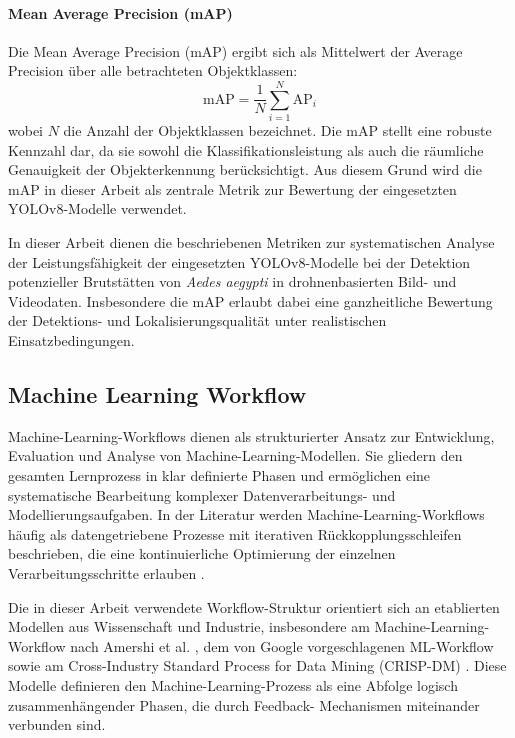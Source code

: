 \paragraph{Mean Average Precision (mAP)}
Die Mean Average Precision (mAP) ergibt sich als Mittelwert der Average Precision
über alle betrachteten Objektklassen:
\begin{equation}
\text{mAP} = \frac{1}{N} \sum_{i=1}^{N} \text{AP}_i
\end{equation}
wobei $N$ die Anzahl der Objektklassen bezeichnet. Die mAP stellt eine robuste
Kennzahl dar, da sie sowohl die Klassifikationsleistung als auch die räumliche
Genauigkeit der Objekterkennung berücksichtigt. Aus diesem Grund wird die mAP in
dieser Arbeit als zentrale Metrik zur Bewertung der eingesetzten YOLOv8-Modelle
verwendet.

In dieser Arbeit dienen die beschriebenen Metriken zur systematischen Analyse der
Leistungsfähigkeit der eingesetzten YOLOv8-Modelle bei der Detektion potenzieller
Brutstätten von \textit{Aedes aegypti} in drohnenbasierten Bild- und Videodaten.
Insbesondere die mAP erlaubt dabei eine ganzheitliche Bewertung der Detektions-
und Lokalisierungsqualität unter realistischen Einsatzbedingungen.


\subsection{Machine Learning Workflow}


Machine-Learning-Workflows dienen als strukturierter Ansatz zur
Entwicklung, Evaluation und Analyse von Machine-Learning-Modellen.
Sie gliedern den gesamten Lernprozess in klar definierte Phasen und
ermöglichen eine systematische Bearbeitung komplexer
Datenverarbeitungs- und Modellierungsaufgaben. In der Literatur werden
Machine-Learning-Workflows häufig als datengetriebene Prozesse mit
iterativen Rückkopplungsschleifen beschrieben, die eine kontinuierliche
Optimierung der einzelnen Verarbeitungsschritte erlauben
\cite{Amershi2019}.

Die in dieser Arbeit verwendete Workflow-Struktur orientiert sich an
etablierten Modellen aus Wissenschaft und Industrie, insbesondere am
Machine-Learning-Workflow nach Amershi et al. \cite{Amershi2019}, dem von
Google vorgeschlagenen ML-Workflow \cite{GoogleML2024} sowie am
Cross-Industry Standard Process for Data Mining (CRISP-DM)
\cite{Wirth2000}. Diese Modelle definieren den Machine-Learning-Prozess
als eine Abfolge logisch zusammenhängender Phasen, die durch Feedback-
Mechanismen miteinander verbunden sind.


